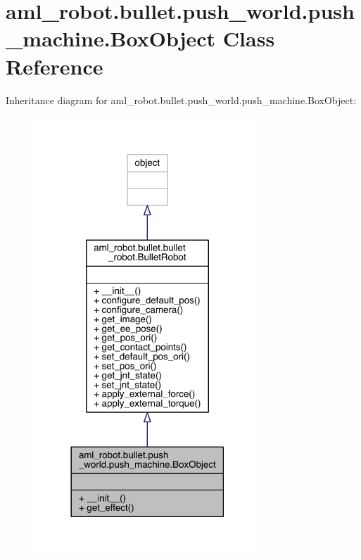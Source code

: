 \hypertarget{classaml__robot_1_1bullet_1_1push__world_1_1push__machine_1_1_box_object}{}\section{aml\+\_\+robot.\+bullet.\+push\+\_\+world.\+push\+\_\+machine.\+Box\+Object Class Reference}
\label{classaml__robot_1_1bullet_1_1push__world_1_1push__machine_1_1_box_object}


Inheritance diagram for aml\+\_\+robot.\+bullet.\+push\+\_\+world.\+push\+\_\+machine.\+Box\+Object\+:\nopagebreak
\begin{figure}[H]
\begin{center}
\leavevmode
\includegraphics[width=242pt]{classaml__robot_1_1bullet_1_1push__world_1_1push__machine_1_1_box_object__inherit__graph}
\end{center}
\end{figure}


